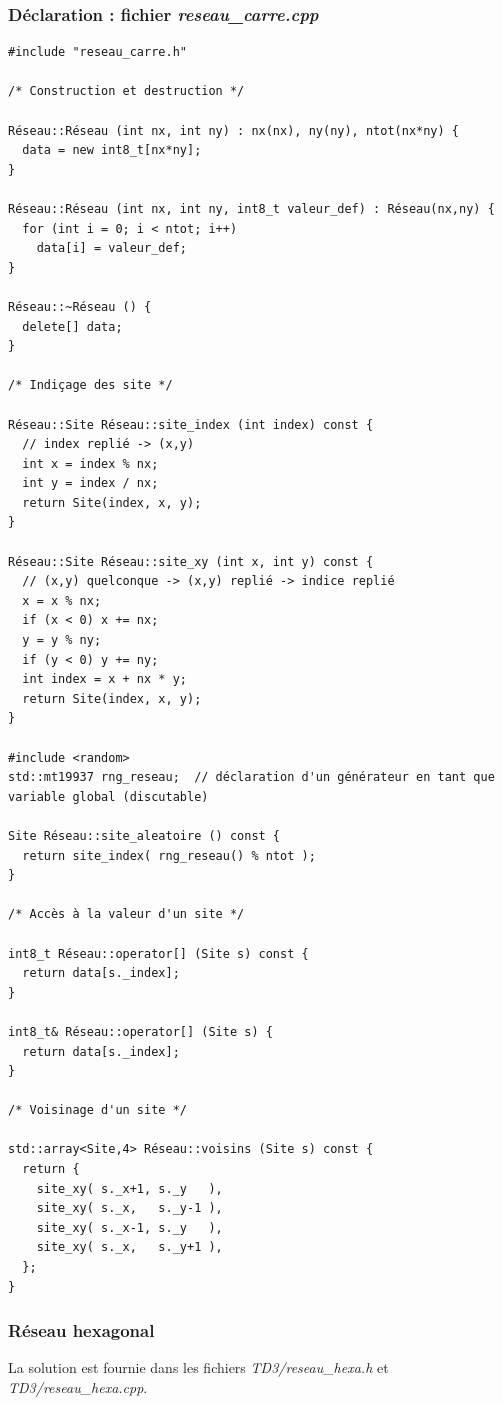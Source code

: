 \documentclass{book}
\def\filename{\emph}
\begin{document}
\begin{correction}
\subsubsection*{Déclaration : fichier \filename{reseau\_carre.cpp}}

\begin{verbatim}
#include "reseau_carre.h"

/* Construction et destruction */

Réseau::Réseau (int nx, int ny) : nx(nx), ny(ny), ntot(nx*ny) {
  data = new int8_t[nx*ny];
}

Réseau::Réseau (int nx, int ny, int8_t valeur_def) : Réseau(nx,ny) {
  for (int i = 0; i < ntot; i++)
    data[i] = valeur_def;
}

Réseau::~Réseau () {
  delete[] data;
}

/* Indiçage des site */

Réseau::Site Réseau::site_index (int index) const {
  // index replié -> (x,y)
  int x = index % nx;
  int y = index / nx;
  return Site(index, x, y);
}

Réseau::Site Réseau::site_xy (int x, int y) const {
  // (x,y) quelconque -> (x,y) replié -> indice replié
  x = x % nx;
  if (x < 0) x += nx;
  y = y % ny;
  if (y < 0) y += ny;
  int index = x + nx * y;
  return Site(index, x, y);
}

#include <random>
std::mt19937 rng_reseau;  // déclaration d'un générateur en tant que variable global (discutable)

Site Réseau::site_aleatoire () const {
  return site_index( rng_reseau() % ntot );
}

/* Accès à la valeur d'un site */

int8_t Réseau::operator[] (Site s) const {
  return data[s._index];
}

int8_t& Réseau::operator[] (Site s) {
  return data[s._index];
}

/* Voisinage d'un site */

std::array<Site,4> Réseau::voisins (Site s) const {
  return {
    site_xy( s._x+1, s._y   ),
    site_xy( s._x,   s._y-1 ),
    site_xy( s._x-1, s._y   ),
    site_xy( s._x,   s._y+1 ),
  };
}
\end{verbatim}

\subsubsection*{Réseau hexagonal}

La solution est fournie dans les fichiers \filename{TD3/reseau\_hexa.h} et \filename{TD3/reseau\_hexa.cpp}.


\end{correction}
\end{document}

